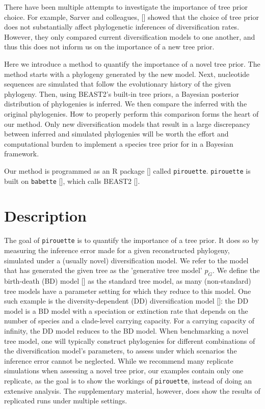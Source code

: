 There have been multiple attempts to investigate the importance of tree
prior choice. For example, Sarver and colleagues, [\cite{sarver2019choice}] 
showed that the choice of tree prior does not 
substantially affect phylogenetic inferences of diversification rates.
However, they only compared current diversification models to one another, 
and thus this does not inform us on the importance of a new tree prior.

Here we introduce a method to quantify the importance of a novel tree prior.
The method starts with a phylogeny generated by the new model. 
Next, nucleotide sequences are simulated that follow the evolutionary history of the given phylogeny. 
Then, using BEAST2's built-in tree priors,
a Bayesian posterior distribution of phylogenies is inferred. 
We then compare the inferred with the original phylogenies. 
How to properly perform this comparison forms the heart of our method.
Only new diversification models that result 
in a large discrepancy between inferred and simulated phylogenies 
will be worth the effort and computational burden to implement 
a species tree prior for in a Bayesian framework.

Our method is programmed as an R package [\cite{R}] called \verb;pirouette;.
\verb;pirouette; is built on \verb;babette; [\cite{bilderbeek2018babette}], 
which calls BEAST2 [\cite{bouckaert2019beast}]. 

\section{Description}

The goal of \verb;pirouette; is to quantify the importance of a tree prior.
It does so by measuring the inference error made 
for a given reconstructed phylogeny, 
simulated under a (usually novel) diversification model.
We refer to the model that has generated the given tree
as the 'generative tree model' $\mathit{p_{G}}$.
We define the birth-death (BD) model [\cite{nee1994reconstructed}] as
the standard tree model, as many (non-standard) tree models 
have a parameter setting for which they reduce to this model. 
One such example is the diversity-dependent (DD) diversification 
model [\cite{etienne2020package, etienne2012diversity}]:
the DD model is a BD model with a speciation or extinction rate that depends 
on the number of species and a clade-level carrying capacity. For a carrying capacity
of infinity, the DD model reduces to the BD model.
When benchmarking a novel tree model, 
one will typically construct phylogenies 
for different combinations of the diversification model's parameters, 
to assess under which scenarios the inference error cannot be neglected. 
While we recommend many replicate simulations 
when assessing a novel tree prior, 
our examples contain only one replicate,
as the goal is to show the workings of \verb;pirouette;,
instead of doing an extensive analysis.
The supplementary material, however, does show the results
of replicated runs under multiple settings.

